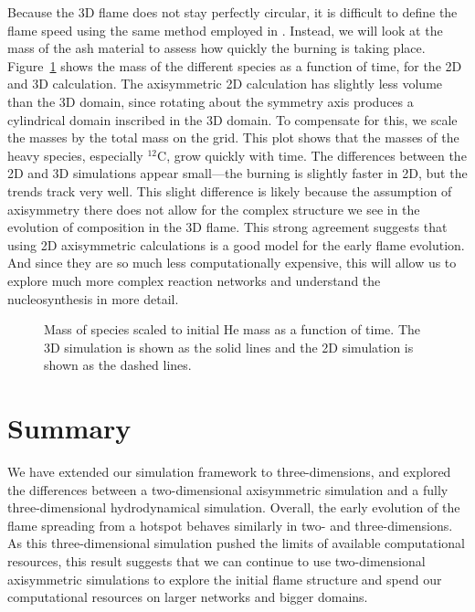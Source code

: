 \documentclass[twocolumn,linenumbers,times,tighten]{aastex631}
\newcommand{\isot}[2]{$^{#2}\mathrm{#1}$}
\begin{document}


Because the 3D flame does not stay perfectly circular, it is difficult
to define the flame speed using the same method employed in
\citet{eiden:2020}.  Instead, we will look at the mass of the ash
material to assess how quickly the burning is taking place.
Figure~\ref{fig:mass_plot} shows the mass of the different species as
a function of time, for the 2D and 3D calculation.  The axisymmetric
2D calculation has slightly less volume than the 3D domain, since
rotating about the symmetry axis produces a cylindrical domain
inscribed in the 3D domain.  To compensate for this, we scale the
masses by the total mass on the grid.  This plot shows that the
masses of the heavy species, especially \isot{C}{12}, grow quickly
with time.  The differences between the 2D and 3D simulations appear
small---the burning is slightly faster in 2D, but the trends track
very well.  This slight difference is likely because the assumption of
axisymmetry there does not allow for the complex structure we see in
the evolution of composition in the 3D flame.  This strong agreement
suggests that using 2D axisymmetric calculations is a good model for
the early flame evolution.  And since they are so much less
computationally expensive, this will allow us to explore much more
complex reaction networks and understand the nucleosynthesis in more
detail.

\begin{figure}[t]
\centering
{}
\caption{\label{fig:mass_plot} Mass of species scaled to initial He
  mass as a function of time.  The 3D simulation is shown as the solid
  lines and the 2D simulation is shown as the dashed lines.}
\end{figure}

\section{Summary}

We have extended our simulation framework to three-dimensions, and
explored the differences between a two-dimensional axisymmetric
simulation and a fully three-dimensional hydrodynamical simulation.
Overall, the early evolution of the flame spreading from a hotspot
behaves similarly in two- and three-dimensions.  As this
three-dimensional simulation pushed the limits of available
computational resources, this result suggests that we can continue to
use two-dimensional axisymmetric simulations to explore the initial
flame structure and spend our computational resources on larger networks
and bigger domains.
\end{document}
